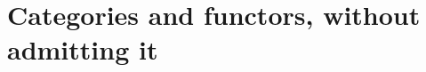 

\chapter{Categories and functors, without admitting it}\label{chap:categories and functors without admitting it}

